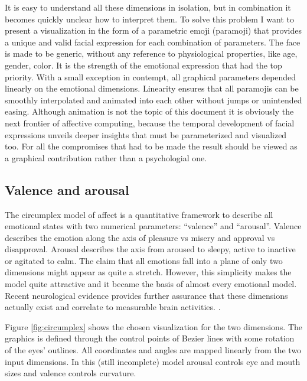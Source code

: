 \documentclass[conference]{IEEEtran}
\begin{document}
It is easy to understand all these dimensions in isolation, but in combination it becomes quickly unclear how to interpret them.
To solve this problem I want to present a visualization in the form of a parametric emoji (paramoji) that provides a
unique and valid facial expression for each combination of parameters.
The face is made to be generic, without any reference to physiological properties, like age, gender, color.
It is the strength of the emotional expression that had the top priority.
With a small exception in contempt, all graphical parameters depended linearly on the emotional dimensions.
Linearity ensures that all paramojis can be smoothly interpolated and animated into each other without jumps or unintended easing.
Although animation is not the topic of this document it is obviously the next frontier of affective computing, because the temporal development of
facial expressions unveils deeper insights that must be parameterized and visualized too.
For all the compromises that had to be made the result should be viewed as a graphical contribution rather than
a psychologial one.

\subsection{Valence and arousal}

The circumplex model of affect is a quantitative framework
to describe all emotional states with two numerical parameters: ``valence'' and ``arousal''\cite{circumplex}.
Valence describes the emotion along the axis of pleasure vs misery and approval vs disapproval. Arousal describes the axis
from aroused to sleepy, active to inactive or agitated to calm.
The claim that all emotions fall into a plane of only two dimensions might appear as quite a stretch.
However, this simplicity makes the model quite attractive and it became the basis of almost every emotional model.
Recent neurological evidence provides further assurance that these dimensions actually exist and correlate to
measurable brain activities. \cite{circumplex2}.

Figure \ref{fig:circumplex} shows the chosen visualization for the two dimensions.
The graphics is defined through the control points of Bezier lines with some rotation of the eyes' outlines.
All coordinates and angles are mapped linearly from the two input dimensions.
In this (still incomplete) model arousal controls eye and mouth sizes and valence controls curvature.
\end{document}

